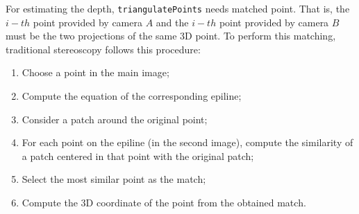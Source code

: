 For estimating the depth, \texttt{triangulatePoints} needs matched point.
That is, the $i{-}th$ point provided by camera $A$ and the $i{-}th$ point provided by camera $B$ must be the two projections of the same 3D point.
To perform this matching, traditional stereoscopy follows this procedure:
\begin{enumerate}
	\itemsep 0em
	\item Choose a point in the main image;
	\item Compute the equation of the corresponding epiline;
	\item Consider a patch around the original point;
	\item For each point on the epiline (in the second image), compute the similarity of a patch centered in that point with the original patch;
	\item Select the most similar point as the match;
	\item Compute the 3D coordinate of the point from the obtained match.
\end{enumerate}
